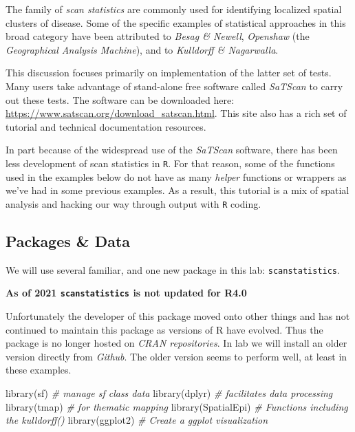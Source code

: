 \documentclass[
]{book}
\newenvironment{Shaded}{\begin{snugshade}}{\end{snugshade}}
\newcommand{\CommentTok}[1]{\textcolor[rgb]{0.56,0.35,0.01}{\textit{#1}}}
\newcommand{\FunctionTok}[1]{\textcolor[rgb]{0.00,0.00,0.00}{#1}}
\newcommand{\NormalTok}[1]{#1}
\newenvironment{rmdcaution}[1]
  {
  \begin{itemize}
  \renewcommand{\labelitemi}{
    \raisebox{-.7\height}[0pt][0pt]{
      {\setkeys{Gin}{width=3em,keepaspectratio}\texttt{[image: images/\#1]}}
    }
  }
  \setlength{\fboxsep}{1em}
  \begin{caution}
  \item
  }
  {
  \end{caution}
  \end{itemize}
  }
\begin{document}
The family of \emph{scan statistics} are commonly used for identifying localized spatial clusters of disease. Some of the specific examples of statistical approaches in this broad category have been attributed to \emph{Besag \& Newell}, \emph{Openshaw} (the \emph{Geographical Analysis Machine}), and to \emph{Kulldorff \& Nagarwalla}.

This discussion focuses primarily on implementation of the latter set of tests. Many users take advantage of stand-alone free software called \emph{SaTScan} to carry out these tests. The software can be downloaded here: \url{https://www.satscan.org/download_satscan.html}. This site also has a rich set of tutorial and technical documentation resources.

In part because of the widespread use of the \emph{SaTScan} software, there has been less development of scan statistics in \texttt{R}. For that reason, some of the functions used in the examples below do not have as many \emph{helper} functions or wrappers as we've had in some previous examples. As a result, this tutorial is a mix of spatial analysis and hacking our way through output with \texttt{R} coding.

\hypertarget{packages-data-2}{%
\subsection{Packages \& Data}\label{packages-data-2}}

We will use several familiar, and one new package in this lab: \texttt{scanstatistics}.

\begin{rmdcaution}{caution}
\textbf{As of 2021 \texttt{scanstatistics} is not updated for R4.0}

Unfortunately the developer of this package moved onto other things and has not continued to maintain this package as versions of R have evolved. Thus the package is no longer hosted on \emph{CRAN repositories}. In lab we will install an older version directly from \emph{Github}. The older version seems to perform well, at least in these examples.

\end{rmdcaution}

\begin{Shaded}
\begin{Highlighting}[]
\FunctionTok{library}\NormalTok{(sf)        }\CommentTok{\# manage sf class data }
\FunctionTok{library}\NormalTok{(dplyr)     }\CommentTok{\# facilitates data processing}
\FunctionTok{library}\NormalTok{(tmap)      }\CommentTok{\# for thematic mapping}
\FunctionTok{library}\NormalTok{(SpatialEpi) }\CommentTok{\# Functions including the kulldorff()}
\FunctionTok{library}\NormalTok{(ggplot2)  }\CommentTok{\# Create a ggplot visualization}
\end{Highlighting}
\end{Shaded}
\end{document}
